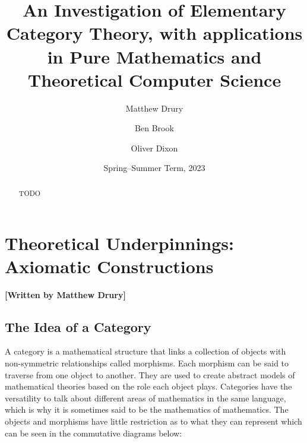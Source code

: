 \documentclass[10pt,a4paper,reqno]{amsart}
\title[An Investigation of Elementary Category Theory]{An Investigation of %
        Elementary Category Theory, with applications in Pure Mathematics and %
        Theoretical Computer Science}
\author{Matthew Drury} \email{\yorkemail{md1499}}
\author{Ben Brook}     \email{\yorkemail{bb1170}}
\author{Oliver Dixon}  \email{\yorkemail{od641}}
\date{Spring--Summer Term, 2023}
\numberwithin{figure}{section}
\begin{document}
\begin{abstract}
        TODO
\end{abstract}
\maketitle
\tableofcontents
\section{Theoretical %
        Underpinnings: Axiomatic Constructions}
\begin{flushright}
        \textbf{[Written by Matthew Drury]}
\end{flushright}


\subsection{The Idea of a Category}
A category is a mathematical structure that links a collection of objects with
non-symmetric relationships called morphisms. Each morphism can be said to
traverse from one object to another. They are used to create abstract models of
mathematical theories based on the role each object plays. Categories have the
versatility to talk about different areas of mathematics in the same language,
which is why it is sometimes said to be the mathematics of mathematics. The
objects and morphisms have little restriction as to what they can represent
which can be seen in the commutative diagrams below:
\end{document}
